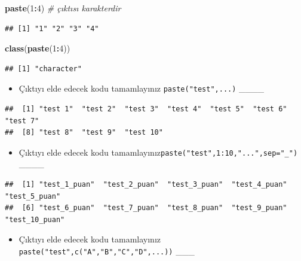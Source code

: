 \documentclass[
  oneside]{book}
\newenvironment{Shaded}{\begin{snugshade}}{\end{snugshade}}
\newcommand{\CommentTok}[1]{\textcolor[rgb]{0.56,0.35,0.01}{\textit{#1}}}
\newcommand{\DecValTok}[1]{\textcolor[rgb]{0.00,0.00,0.81}{#1}}
\newcommand{\FunctionTok}[1]{\textcolor[rgb]{0.13,0.29,0.53}{\textbf{#1}}}
\newcommand{\NormalTok}[1]{#1}
\newcommand{\SpecialCharTok}[1]{\textcolor[rgb]{0.81,0.36,0.00}{\textbf{#1}}}
\providecommand{\tightlist}{%
  \setlength{\itemsep}{0pt}\setlength{\parskip}{0pt}}
\begin{document}
\begin{Shaded}
\begin{Highlighting}[]
\FunctionTok{paste}\NormalTok{(}\DecValTok{1}\SpecialCharTok{:}\DecValTok{4}\NormalTok{) }\CommentTok{\# çıktısı karakterdir}
\end{Highlighting}
\end{Shaded}

\begin{verbatim}
## [1] "1" "2" "3" "4"
\end{verbatim}

\begin{Shaded}
\begin{Highlighting}[]
\FunctionTok{class}\NormalTok{(}\FunctionTok{paste}\NormalTok{(}\DecValTok{1}\SpecialCharTok{:}\DecValTok{4}\NormalTok{))}
\end{Highlighting}
\end{Shaded}

\begin{verbatim}
## [1] "character"
\end{verbatim}

\begin{itemize}
\tightlist
\item
  Çıktıyı elde edecek kodu tamamlayınız \texttt{paste("test",...)} \_\_\_\_
\end{itemize}

\begin{verbatim}
##  [1] "test 1"  "test 2"  "test 3"  "test 4"  "test 5"  "test 6"  "test 7" 
##  [8] "test 8"  "test 9"  "test 10"
\end{verbatim}

\begin{itemize}
\tightlist
\item
  Çıktıyı elde edecek kodu tamamlayınız\texttt{paste("test",1:10,"...",sep="\_")} \_\_\_\_
\end{itemize}

\begin{verbatim}
##  [1] "test_1_puan"  "test_2_puan"  "test_3_puan"  "test_4_puan"  "test_5_puan" 
##  [6] "test_6_puan"  "test_7_puan"  "test_8_puan"  "test_9_puan"  "test_10_puan"
\end{verbatim}

\begin{itemize}
\tightlist
\item
  Çıktıyı elde edecek kodu tamamlayınız \texttt{paste("test",c("A","B","C","D",...))} \_\_\_
\end{itemize}
\end{document}
